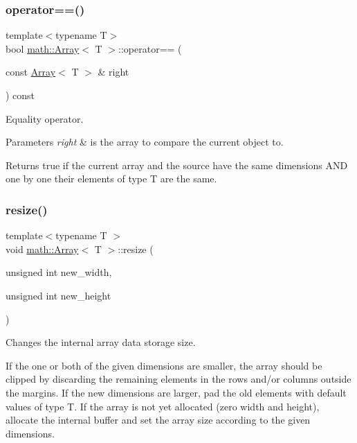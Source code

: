 \subsubsection{\texorpdfstring{operator==()}{operator==()}}
{\footnotesize\ttfamily template$<$typename T$>$ \\
bool \hyperlink{classmath_1_1_array}{math\+::\+Array}$<$ T $>$\+::operator== (\begin{DoxyParamCaption}\item[{const \hyperlink{classmath_1_1_array}{Array}$<$ T $>$ \&}]{right }\end{DoxyParamCaption}) const}

Equality operator.


\begin{DoxyParams}{Parameters}
{\em right} & is the array to compare the current object to.\\
\hline
\end{DoxyParams}
\begin{DoxyReturn}{Returns}
true if the current array and the source have the same dimensions A\+ND one by one their elements of type T are the same. 
\end{DoxyReturn}
\mbox{\label{classmath_1_1_array_a0a4294917127f526f4a98c460acd7918}} 
\subsubsection{\texorpdfstring{resize()}{resize()}}
{\footnotesize\ttfamily template$<$typename T $>$ \\
void \hyperlink{classmath_1_1_array}{math\+::\+Array}$<$ T $>$\+::resize (\begin{DoxyParamCaption}\item[{unsigned int}]{new\+\_\+width,  }\item[{unsigned int}]{new\+\_\+height }\end{DoxyParamCaption})}

Changes the internal array data storage size.

If the one or both of the given dimensions are smaller, the array should be clipped by discarding the remaining elements in the rows and/or columns outside the margins. If the new dimensions are larger, pad the old elements with default values of type T. If the array is not yet allocated (zero width and height), allocate the internal buffer and set the array size according to the given dimensions.


